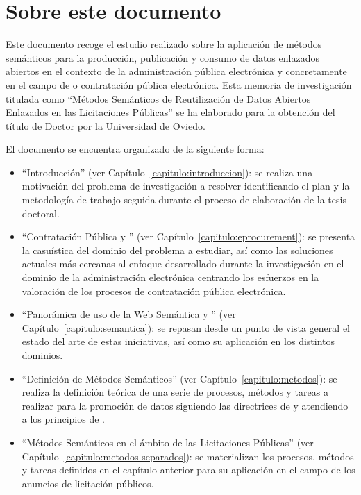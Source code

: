 \chapter*{Sobre este documento}

Este documento recoge el estudio realizado sobre la aplicación
de métodos semánticos para la producción, publicación y consumo 
de datos enlazados abiertos en el contexto de la administración pública
electrónica y concretamente en el campo de \eproc o contratación pública
electrónica. Esta memoria de investigación titulada como
``Métodos Semánticos de Reutilización de Datos Abiertos Enlazados en las
Licitaciones Públicas'' se ha elaborado para la obtención del título
de Doctor por la Universidad de Oviedo.

El documento se encuentra organizado de la siguiente forma:
\begin{itemize}
\item ``Introducción'' (ver Capítulo~\ref{capitulo:introduccion}): se realiza
una motivación del problema de investigación a resolver identificando el plan
y la metodología de trabajo seguida durante el proceso de elaboración
de la tesis doctoral.

\item ``Contratación Pública y \eproc'' (ver Capítulo~\ref{capitulo:eprocurement}): se 
presenta la casuística del dominio del problema a estudiar, así como las soluciones
actuales más cercanas al enfoque desarrollado durante la investigación en el dominio
de la administración electrónica centrando los esfuerzos en la valoración
de los procesos de contratación pública electrónica.

\item ``Panorámica de uso de la Web Semántica y \linkeddata'' (ver Capítulo~\ref{capitulo:semantica}): se
repasan desde un punto de vista general el estado del arte de estas iniciativas, así como
su aplicación en los distintos dominios.

\item ``Definición de Métodos Semánticos'' (ver Capítulo~\ref{capitulo:metodos}): se realiza
la definición teórica de una serie de procesos, métodos y tareas a realizar para la promoción
de datos siguiendo las directrices de \linkeddata y atendiendo a los principios
de \opendata.

\item ``Métodos Semánticos en el ámbito de las Licitaciones Públicas'' (ver Capítulo~\ref{capitulo:metodos-separados}): se materializan 
los procesos, métodos y tareas definidos en el capítulo anterior para su aplicación en el campo de los anuncios de licitación públicos.



\end{itemize}
